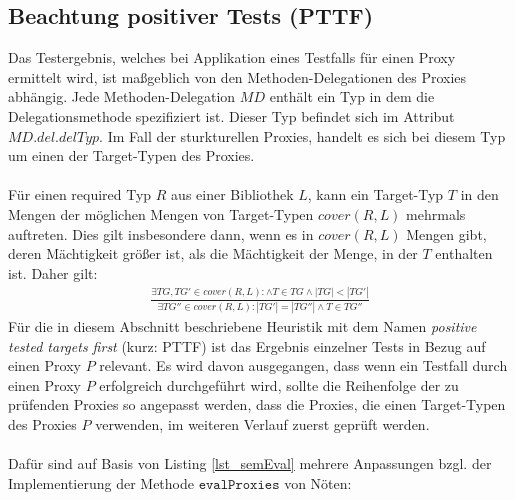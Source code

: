 \subsection{Beachtung positiver Tests (PTTF)}\label{sec_pttf}
Das Testergebnis, welches bei Applikation eines Testfalls für einen Proxy ermittelt wird, ist maßgeblich von den Methoden-Delegationen des Proxies abhängig. Jede Methoden-Delegation $\mathit{MD}$ enthält ein Typ in dem die Delegationsmethode spezifiziert ist. Dieser Typ befindet sich im Attribut $\mathit{MD.del.delTyp}$. Im Fall der sturkturellen Proxies, handelt es sich bei diesem Typ um einen der Target-Typen des Proxies.
\\\\
Für einen required Typ $R$ aus einer Bibliothek $L$, kann ein Target-Typ $T$ in den Mengen der möglichen Mengen von Target-Typen $\mathit{cover(R,L)}$ mehrmals auftreten. Dies gilt insbesondere dann, wenn es in $\mathit{cover(R,L)}$ Mengen gibt, deren Mächtigkeit größer ist, als die Mächtigkeit der Menge, in der $T$ enthalten ist. Daher gilt:
\begin{gather*}
\frac{\exists \mathit{TG},\mathit{TG'} \in \mathit{cover(R,L)} : \wedge T \in \mathit{TG} \wedge |\mathit{TG}| < |\mathit{TG'}|}{\exists \mathit{TG''} \in \mathit{cover(R,L)} : |\mathit{TG'}| = |\mathit{TG''}| \wedge T \in \mathit{TG''}}
\end{gather*}
\noindent
Für die in diesem Abschnitt beschriebene Heuristik mit dem Namen \emph{positive tested targets first} (kurz: PTTF) ist das Ergebnis einzelner Tests in Bezug auf einen Proxy $P$ relevant. Es wird davon ausgegangen, dass wenn ein Testfall durch einen Proxy $P$ erfolgreich durchgeführt wird, sollte die Reihenfolge der zu prüfenden Proxies so angepasst werden, dass die Proxies, die einen Target-Typen des Proxies $P$ verwenden, im weiteren Verlauf zuerst geprüft werden.
\\\\
Dafür sind auf Basis von Listing \ref{lst_semEval} mehrere Anpassungen bzgl. der Implementierung der Methode $\texttt{evalProxies}$ von Nöten:
